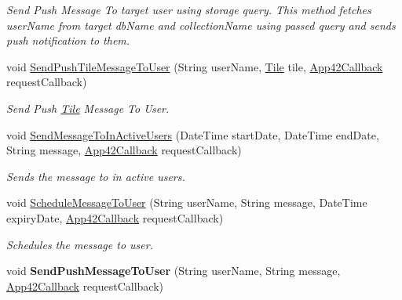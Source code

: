 \begin{DoxyCompactItemize}
\begin{DoxyCompactList}\small\item\em Send Push Message To target user using storage query. This method fetches user\+Name from target db\+Name and collection\+Name using passed query and sends push notification to them. \end{DoxyCompactList}\item 
void \hyperlink{classcom_1_1shephertz_1_1app42_1_1paas_1_1sdk_1_1windows_1_1push_1_1_push_notification_service_aa3459d31d4cc41cc29cb46c64f0b094c}{Send\+Push\+Tile\+Message\+To\+User} (String user\+Name, \hyperlink{classcom_1_1shephertz_1_1app42_1_1paas_1_1sdk_1_1windows_1_1push_1_1_tile}{Tile} tile, \hyperlink{interfacecom_1_1shephertz_1_1app42_1_1paas_1_1sdk_1_1windows_1_1_app42_callback}{App42\+Callback} request\+Callback)
\begin{DoxyCompactList}\small\item\em Send Push \hyperlink{classcom_1_1shephertz_1_1app42_1_1paas_1_1sdk_1_1windows_1_1push_1_1_tile}{Tile} Message To User. \end{DoxyCompactList}\item 
void \hyperlink{classcom_1_1shephertz_1_1app42_1_1paas_1_1sdk_1_1windows_1_1push_1_1_push_notification_service_ab2c8ae5a972915d6db0f048cb184cadf}{Send\+Message\+To\+In\+Active\+Users} (Date\+Time start\+Date, Date\+Time end\+Date, String message, \hyperlink{interfacecom_1_1shephertz_1_1app42_1_1paas_1_1sdk_1_1windows_1_1_app42_callback}{App42\+Callback} request\+Callback)
\begin{DoxyCompactList}\small\item\em Sends the message to in active users. \end{DoxyCompactList}\item 
void \hyperlink{classcom_1_1shephertz_1_1app42_1_1paas_1_1sdk_1_1windows_1_1push_1_1_push_notification_service_aa30426dda4dcd827c3284669e1283c8c}{Schedule\+Message\+To\+User} (String user\+Name, String message, Date\+Time expiry\+Date, \hyperlink{interfacecom_1_1shephertz_1_1app42_1_1paas_1_1sdk_1_1windows_1_1_app42_callback}{App42\+Callback} request\+Callback)
\begin{DoxyCompactList}\small\item\em Schedules the message to user. \end{DoxyCompactList}\item 
\hypertarget{classcom_1_1shephertz_1_1app42_1_1paas_1_1sdk_1_1windows_1_1push_1_1_push_notification_service_a81a2877359fa3e30903207cf54fbde37}{void {\bfseries Send\+Push\+Message\+To\+User} (String user\+Name, String message, \hyperlink{interfacecom_1_1shephertz_1_1app42_1_1paas_1_1sdk_1_1windows_1_1_app42_callback}{App42\+Callback} request\+Callback)}\label{classcom_1_1shephertz_1_1app42_1_1paas_1_1sdk_1_1windows_1_1push_1_1_push_notification_service_a81a2877359fa3e30903207cf54fbde37}


\end{DoxyCompactItemize}
